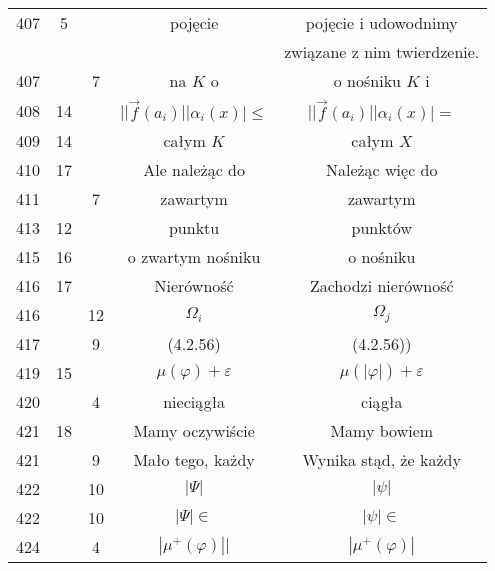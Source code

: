 \documentclass[a4paper,11pt]{article}
\begin{document}
\begin{center}
\begin{tabular}{|c|c|c|c|c|}
    407 &  5 & & pojęcie & pojęcie i udowodnimy \\
    & & & & związane z nim twierdzenie. \\
    407 & &  7 & na $K$ o & o nośniku $K$ i \\
    408 & 14 & & $|| \vec{ f }( a_{ i } ) || \alpha_{ i }( x ) \big| \leq$
           & $|| \vec{ f }( a_{ i } ) || \alpha_{ i }( x ) \big| =$ \\
    409 & 14 & & całym $K$ & całym $X$ \\
    410 & 17 & & Ale należąc do & Należąc więc do \\
    411 & &  7 & zawartym & zawartym \\
    413 & 12 & & punktu & punktów \\
    415 & 16 & & o zwartym nośniku & o nośniku \\
    416 & 17 & & Nierówność & Zachodzi nierówność \\
    416 & & 12 & $\Omega_{ i }$ & $\Omega_{ j }$ \\
    417 & &  9 & (4.2.56) & (4.2.56)) \\
    419 & 15 & & $\mu( \varphi ) + \varepsilon$ & $\mu( | \varphi | )
                                                  + \varepsilon$ \\
    420 & &  4 & nieciągła & ciągła \\
    421 & 18 & & Mamy oczywiście & Mamy bowiem \\
    421 & &  9 & Mało tego, każdy & Wynika stąd, że każdy \\
    422 & & 10 & $| \Psi | $ & $| \psi |$ \\
    422 & & 10 & $| \Psi | \in$ & $| \psi | \in$ \\
    424 & &  4 & $| \mu^{ + }( \varphi ) ||$ & $| \mu^{ + }( \varphi ) |$ \\
    \hline
  \end{tabular}


\end{center}
\end{document}
